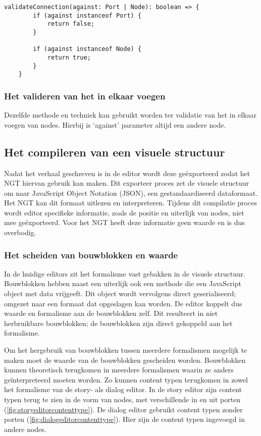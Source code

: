 \lstset{language=JavaScript}
\begin{lstlisting}[caption={Een voorbeeld van een validatie functie in Typescript.},captionpos=b,label={lst:validationfunction}]
    validateConnection(against: Port | Node): boolean => {
        if (against instanceof Port) {
            return false;
        }

        if (against instanceof Node) {
            return true;
        }
    }
\end{lstlisting}

\subsubsection{Het valideren van het in elkaar voegen}
Dezelfde methode en techniek kan gebruikt worden ter validatie van het in elkaar voegen van nodes. Hierbij is ‘against’ parameter altijd een andere node.

\subsection{Het compileren van een visuele structuur}
\label{subsec:hetcompilerenvaneenvisuelestructuur}
Nadat het verhaal geschreven is in de editor wordt deze geëxporteerd zodat het NGT hiervan gebruik kan maken. Dit exporteer proces zet de visuele structuur om naar JavaScript Object Notation (JSON), een gestandaardiseerd dataformaat. Het NGT kan dit formaat uitlezen en interpreteren. Tijdens dit compilatie proces wordt editor specifieke informatie, zoals de positie en uiterlijk van nodes, niet mee geëxporteerd. Voor het NGT heeft deze informatie geen waarde en is dus overbodig.

\subsubsection{Het scheiden van bouwblokken en waarde}
In de huidige editors zit het formalisme vast gebakken in de visuele structuur. Bouwblokken hebben naast een uiterlijk ook een methode die een JavaScript object met data vrijgeeft. Dit object wordt vervolgens direct geserialiseerd; omgezet naar een formaat dat opgeslagen kan worden. De editor koppelt dus waarde en formalisme aan de bouwblokken zelf. Dit resulteert in niet herbruikbare bouwblokken; de bouwblokken zijn direct gekoppeld aan het formalisme.

Om het hergebruik van bouwblokken tussen meerdere formalismen mogelijk te maken moet de waarde van de bouwblokken gescheiden worden. Bouwblokken kunnen theoretisch terugkomen in meerdere formalismen waarin ze anders geïnterpreteerd moeten worden. Zo kunnen content typen terugkomen in zowel het formalisme van de story- als dialog editor. In de story editor zijn content typen terug te zien in de vorm van nodes, met verschillende in en uit porten (\autoref{fig:storyeditorcontenttype}). De dialog editor gebruikt content typen zonder porten (\autoref{fig:dialogeditorcontenttype}). Hier zijn de content typen ingevoegd in andere nodes.

